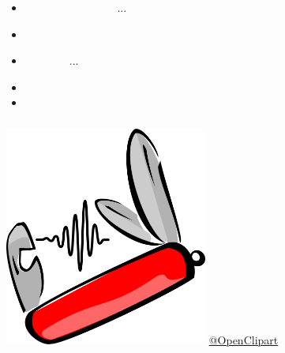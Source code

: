 \documentclass[usenames,dvipsnames, 18pt, compress, aspectratio=169]{beamer}
\def\audio{{\FA \faFileAudioO}}
\def\cut{{\FA \faCut}}
\def\spinner{{\FA \faSpinner}}
\def\music{{\FA \faMusic}}
\def\sliders{{\FA \faSliders}}
\begin{document}
\begin{frame}[fragile]{}
    \frametitle{}
    \begin{center}
        \begin{itemize}[]
            \fontsize{20pt}{21}\selectfont
            \item {\hfil \music \ \ \ \ \music \ \ \ \ \music \ \ \ \ \music
                \ \ \ \  ...  \ \ \ \ \music}

            \fontsize{15pt}{16}\selectfont

            \item \vspace{0.5cm}{\hfil \cut \ \ \ \ \spinner \ \ \ \ \sliders}\vspace{0.5cm}

            \fontsize{20pt}{21}\selectfont
            \item {\hfil \audio \ \ \ \ \audio \ \ \ \ ... \ \ \ \ \audio}

            \fontsize{15pt}{16}\selectfont
            \item \vspace{0.5cm}{\hfil \cut \ \ \ \ \spinner \ \ \ \ \sliders}\vspace{0.5cm}

            \fontsize{20pt}{21}\selectfont
            \item {\hfil \audio}
        \end{itemize}
    \end{center}
\end{frame}

\begin{frame}
    \frametitle{}
    \begin{center}
        \includegraphics[width=0.5\textwidth,center]{swiss_knife.png}
        \vspace{-0.8cm}
        \hspace*{6cm}
        \href{https://freesvg.org/by/OpenClipart}
             {\color{black}\fontsize{5pt}{0}\selectfont @OpenClipart}

    \end{center}
\end{frame}
\end{document}
